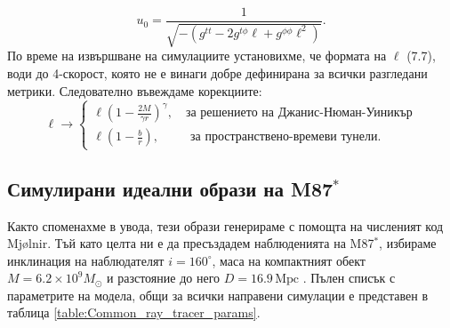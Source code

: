 \begin{equation}
	u_0 = \frac{1}{\sqrt{-(g^{tt} - 2g^{t\phi}\ell + g^{\phi\phi}\ell^2)}}.
\end{equation}
По време на извършване на симулациите установихме, че формата на $\ell$ (7.7), води до 4-скорост, която не е винаги добре дефинирана за всички разгледани метрики. Следователно въвеждаме корекциите:
\begin{equation}
	\ell\rightarrow\begin{cases}
		\ell \left(1 - \frac{2M}{\gamma r}\right)^{\gamma}, \quad\text{за решението на Джанис-Нюман-Уиникър}\\
		\ell \left(1 - \frac{b}{r}\right), \,\,\,\qquad\text{за пространствено-времеви тунели}.
	\end{cases}
\end{equation}
\subsection{Симулирани идеални образи на M87$^*$}
Както споменахме в увода, тези образи генерираме с помощта на численият код Mjølnir. Тъй като целта ни е да пресъздадем наблюденията на M87$^*$, избираме инклинация на наблюдателят $i = 160^\circ$, маса на компактният обект $M = 6.2\times 10^9M_\odot$ и разстояние до него $D = 16.9\, \text{Mpc}$ \cite{EHT_M87_I}. Пълен списък с параметрите на модела, общи за всички направени симулации е представен в таблица \ref{table:Common_ray_tracer_params}.\\

